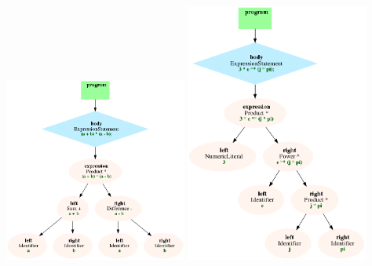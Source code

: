 \item

\includegraphics[width=0.45\textwidth]{../tex-snippets/ex-syntax-tree-1-img-a.png}
\includegraphics[width=0.45\textwidth]{../tex-snippets/ex-syntax-tree-1-img-b.png}
\\


